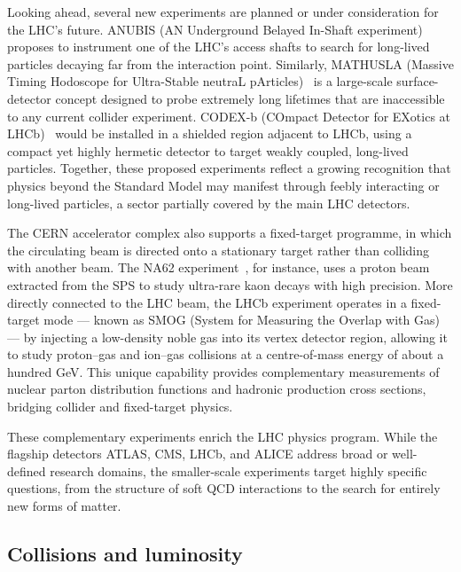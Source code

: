 Looking ahead, several new experiments are planned or under consideration for the LHC's future. ANUBIS (AN Underground Belayed In-Shaft experiment)~\cite{ANUBIS:proposal} proposes to instrument one of the LHC's access shafts to search for long-lived particles decaying far from the interaction point. Similarly, MATHUSLA (Massive Timing Hodoscope for Ultra-Stable neutraL pArticles)~\cite{MATHUSLA:physics} is a large-scale surface-detector concept designed to probe extremely long lifetimes that are inaccessible to any current collider experiment. CODEX-b (COmpact Detector for EXotics at LHCb)~\cite{CODEXb:concept} would be installed in a shielded region adjacent to LHCb, using a compact yet highly hermetic detector to target weakly coupled, long-lived particles. Together, these proposed experiments reflect a growing recognition that physics beyond the Standard Model may manifest through feebly interacting or long-lived particles, a sector partially covered by the main LHC detectors.

The CERN accelerator complex also supports a fixed-target programme, in which the circulating beam is directed onto a stationary target rather than colliding with another beam. The NA62 experiment~\cite{NA62:detector}, for instance, uses a proton beam extracted from the SPS to study ultra-rare kaon decays with high precision. More directly connected to the LHC beam, the LHCb experiment operates in a fixed-target mode --- known as SMOG (System for Measuring the Overlap with Gas)~\cite{LHCb:SMOG, LHCb:SMOG2} --- by injecting a low-density noble gas into its vertex detector region, allowing it to study proton--gas and ion--gas collisions at a centre-of-mass energy of about a hundred GeV. This unique capability provides complementary measurements of nuclear parton distribution functions and hadronic production cross sections, bridging collider and fixed-target physics.

\vspace{0.5 cm}

These complementary experiments enrich the LHC physics program. While the flagship detectors ATLAS, CMS, LHCb, and ALICE address broad or well-defined research domains, the smaller-scale experiments target highly specific questions, from the structure of soft QCD interactions to the search for entirely new forms of matter.




\subsection{Collisions and luminosity}
\label{subsec:CollisionsAndLuminosity}

